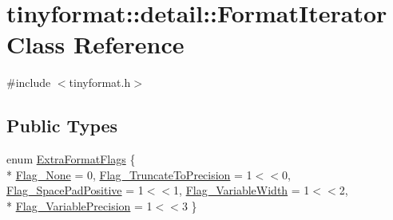 \hypertarget{classtinyformat_1_1detail_1_1_format_iterator}{}\section{tinyformat\+:\+:detail\+:\+:Format\+Iterator Class Reference}
\label{classtinyformat_1_1detail_1_1_format_iterator}


{\ttfamily \#include $<$tinyformat.\+h$>$}

\subsection*{Public Types}
\begin{DoxyCompactItemize}
\item 
enum \hyperlink{classtinyformat_1_1detail_1_1_format_iterator_a219d15b3b08e2e2039043d2e992cc0b4}{Extra\+Format\+Flags} \{ \\*
\hyperlink{classtinyformat_1_1detail_1_1_format_iterator_a219d15b3b08e2e2039043d2e992cc0b4a9ab97a1e3a40d92f84e93fa8358482aa}{Flag\+\_\+\+None} = 0, 
\hyperlink{classtinyformat_1_1detail_1_1_format_iterator_a219d15b3b08e2e2039043d2e992cc0b4a5b65abd67b2208298644ddc94687e390}{Flag\+\_\+\+Truncate\+To\+Precision} = 1$<$$<$0, 
\hyperlink{classtinyformat_1_1detail_1_1_format_iterator_a219d15b3b08e2e2039043d2e992cc0b4a9d39e70884631652913a219fc8c631a9}{Flag\+\_\+\+Space\+Pad\+Positive} = 1$<$$<$1, 
\hyperlink{classtinyformat_1_1detail_1_1_format_iterator_a219d15b3b08e2e2039043d2e992cc0b4a5d0e44bf22d5a33b12af70fab06a595d}{Flag\+\_\+\+Variable\+Width} = 1$<$$<$2, 
\\*
\hyperlink{classtinyformat_1_1detail_1_1_format_iterator_a219d15b3b08e2e2039043d2e992cc0b4a19e53a79433733d40dc1349ce52f3284}{Flag\+\_\+\+Variable\+Precision} = 1$<$$<$3
 \}
\end{DoxyCompactItemize}
